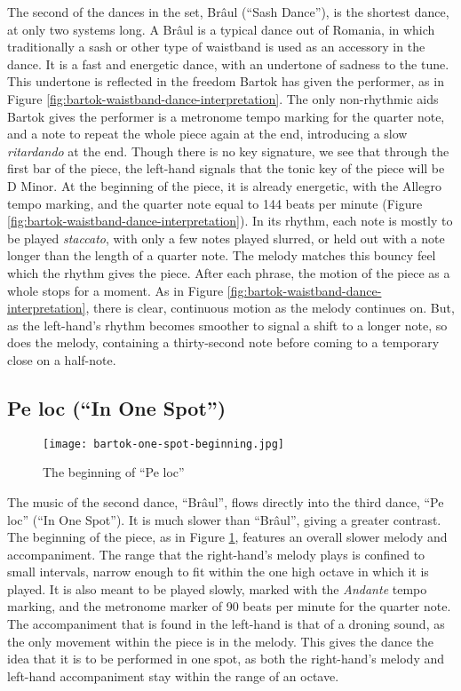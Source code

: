 The second of the dances in the set, Brâul (``Sash Dance''), is the shortest dance, at only two systems long. A Brâul is a typical dance out of Romania, in which traditionally a sash or other type of waistband is used as an accessory in the dance. It is a fast and energetic dance, with an undertone of sadness to the tune. This undertone is reflected in the freedom Bartok has given the performer, as in Figure \ref{fig:bartok-waistband-dance-interpretation}\autocite{Lung_2016}. The only non-rhythmic aids Bartok gives the performer is a metronome tempo marking for the quarter note, and a note to repeat the whole piece again at the end, introducing a slow \textit{ritardando} at the end. Though there is no key signature, we see that through the first bar of the piece, the left-hand signals that the tonic key of the piece will be D Minor. At the beginning of the piece, it is already energetic, with the Allegro tempo marking, and the quarter note equal to 144 beats per minute (Figure \ref{fig:bartok-waistband-dance-interpretation}\autocite{Lung_2016}). In its rhythm, each note is mostly to be played \textit{staccato}, with only a few notes played slurred, or held out with a note longer than the length of a quarter note. The melody matches this bouncy feel which the rhythm gives the piece. After each phrase, the motion of the piece as a whole stops for a moment. As in Figure \ref{fig:bartok-waistband-dance-interpretation}\autocite{Lung_2016}, there is clear, continuous motion as the melody continues on. But, as the left-hand's rhythm becomes smoother to signal a shift to a longer note, so does the melody, containing a thirty-second note before coming to a temporary close on a half-note. 

\subsection{Pe loc (``In One Spot'')}

\begin{figure}
  \centering
  \texttt{[image: bartok-one-spot-beginning.jpg]}
  \caption[The beginning of ``Pe loc'', in Bartok's \textit{Six Romanian Folk Dances}, Sz. 56, BB 68]{The beginning of ``Pe loc''}  
  \label{fig:bartok-one-spot-beginning}
\end{figure}

The music of the second dance, ``Brâul'', flows directly into the third dance, ``Pe loc'' (``In One Spot''). It is much slower than ``Brâul'', giving a greater contrast. The beginning of the piece, as in Figure \ref{fig:bartok-one-spot-beginning}\autocite{Lung_2016}, features an overall slower melody and accompaniment. The range that the right-hand's melody plays is confined to small intervals, narrow enough to fit within the one high octave in which it is played. It is also meant to be played slowly, marked with the \textit{Andante} tempo marking, and the metronome marker of 90 beats per minute for the quarter note. The accompaniment that is found in the left-hand is that of a droning sound, as the only movement within the piece is in the melody. This gives the dance the idea that it is to be performed in one spot, as both the right-hand's melody and left-hand accompaniment stay within the range of an octave.

